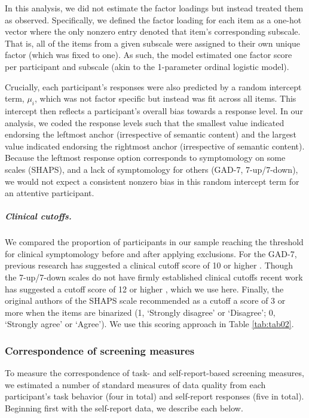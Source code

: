\documentclass[a4paper,notitlepage,12pt]{article}
\begin{document}
In this analysis, we did not estimate the factor loadings but instead treated them as observed. Specifically, we defined the factor loading for each item as a one-hot vector where the only nonzero entry denoted that item's corresponding subscale. That is, all of the items from a given subscale were assigned to their own unique factor (which was fixed to one). As such, the model estimated one factor score per participant and subscale (akin to the 1-parameter ordinal logistic model).

Crucially, each participant's responses were also predicted by a random intercept term, $\mu_i$, which was not factor specific but instead was fit across all items. This intercept then reflects a participant's overall bias towards a response level. In our analysis, we coded the response levels such that the smallest value indicated endorsing the leftmost anchor (irrespective of semantic content) and the largest value indicated endorsing the rightmost anchor (irrespective of semantic content). Because the leftmost response option corresponds to symptomology on some scales (SHAPS), and a lack of symptomology for others (GAD-7, 7-up/7-down), we would not expect a consistent nonzero bias in this random intercept term for an attentive participant. 

\subparagraph{Clinical cutoffs.} We compared the proportion of participants in our sample reaching the threshold for clinical symptomology before and after applying exclusions. For the GAD-7, previous research has suggested a clinical cutoff score of 10 or higher \cite{lowe2008validation, hinz2017psychometric}. Though the 7-up/7-down scales do not have firmly established clinical cutoffs recent work has suggested a cutoff score of 12 or higher \cite{youngstrom2020evaluating}, which we use here. Finally, the original authors of the SHAPS scale recommended as a cutoff a score of 3 or more when the items are binarized (1, `Strongly disagree' or `Disagree'; 0, `Strongly agree' or `Agree'). We use this scoring approach in Table \ref{tab:tab02}.   

\subsubsection*{Correspondence of screening measures}

To measure the correspondence of task- and self-report-based screening measures, we estimated a number of standard measures of data quality from each participant's task behavior (four in total) and self-report responses (five in total). Beginning first with the self-report data, we describe each below.
\end{document}
